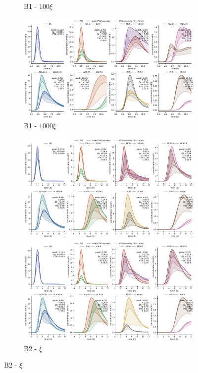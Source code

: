\documentclass[fleqn,10pt]{wlscirep}
\begin{document}
\begin{figure}
\begin{subfigure}{0.5 \linewidth}
    \caption{B1 - $100 \xi$}
    \includegraphics[width=1\linewidth]{figures/modelB1-1000_conc_at_label.png}
    \caption{B1 - $1000 \xi$}
\end{subfigure}
\begin{subfigure}{0.5 \linewidth}
    \centering
    \includegraphics[width=1\linewidth]{figures/modelB2-1_conc_at_label.png}
    \caption{B2 - $\xi$}
    \includegraphics[width=1\linewidth]{figures/modelB2-10_conc_at_label.png}

\end{subfigure}
\end{figure}
\end{document}
